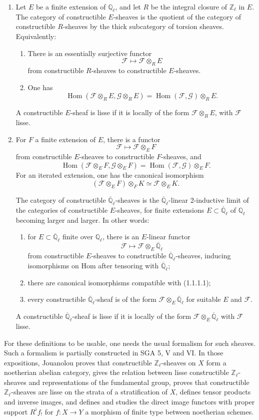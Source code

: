 \documentclass[11pt]{article}
\theoremstyle{remark}
\newcommand{\Ql}{\mathbb{Q}_\ell}
\newcommand{\Qlb}{\overline{\mathbb{Q}}_\ell}
\newcommand{\Zl}{\mathbb{Z}_\ell}
\newcommand{\Hom}{\operatorname{Hom}}
\begin{document}
\begin{enumerate}[label=\alph*)]
\item Let $E$ be a finite extension of $\Ql$, and let $R$ be the integral closure of $\Zl$ in $E$. The category of constructible $E$-sheaves is the quotient of the category of constructible $R$-sheaves by the thick subcategory of torsion sheaves. Equivalently:
\begin{enumerate}[label=(\roman*)]
\item There is an essentially surjective functor
\[
\mathcal F\longmapsto \mathcal F\otimes_R E
\]
from constructible $R$-sheaves to constructible $E$-sheaves.
\item One has
\[
\Hom(\mathcal F\otimes_R E,\mathcal G\otimes_R E)
   = \Hom(\mathcal F,\mathcal G)\otimes_R E.
\]
\end{enumerate}
A constructible $E$-sheaf is lisse if it is locally of the form $\mathcal F\otimes_R E$, with $\mathcal F$ lisse.

\item For $F$ a finite extension of $E$, there is a functor
\[
\mathcal F\longmapsto \mathcal F\otimes_E F
\]
from constructible $E$-sheaves to constructible $F$-sheaves, and
\[
\Hom(\mathcal F\otimes_E F,\mathcal G\otimes_E F)
  =\Hom(\mathcal F,\mathcal G)\otimes_E F.
\]
For an iterated extension, one has the canonical isomorphism
\[
(\mathcal F\otimes_E F)\otimes_F K\simeq \mathcal F\otimes_E K. \tag{1.1.1.1}
\]

The category of constructible $\Qlb$-sheaves is the $\Qlb$-linear 2-inductive limit of the categories of constructible $E$-sheaves, for finite extensions $E\subset\Qlb$ of $\Ql$ becoming larger and larger. In other words:
\begin{enumerate}[label=(\roman*)]
\item for $E\subset\Qlb$ finite over $\Ql$, there is an $E$-linear functor
\[
\mathcal F\longmapsto \mathcal F\otimes_E \Qlb
\]
from constructible $E$-sheaves to constructible $\Qlb$-sheaves, inducing isomorphisms on Hom after tensoring with $\Qlb$;
\item there are canonical isomorphisms compatible with (1.1.1.1);
\item every constructible $\Qlb$-sheaf is of the form $\mathcal F\otimes_E\Qlb$ for suitable $E$ and $\mathcal F$.
\end{enumerate}
A constructible $\Qlb$-sheaf is lisse if it is locally of the form $\mathcal F\otimes_E\Qlb$ with $\mathcal F$ lisse.
\end{enumerate}

For these definitions to be usable, one needs the usual formalism for such sheaves. Such a formalism is partially constructed in SGA 5, V and VI. In those expositions, Jouanolou proves that constructible $\Zl$-sheaves on $X$ form a noetherian abelian category, gives the relation between lisse constructible $\Zl$-sheaves and representations of the fundamental group, proves that constructible $\Zl$-sheaves are lisse on the strata of a stratification of $X$, defines tensor products and inverse images, and defines and studies the direct image functors with proper support $R^if_!$ for $f:X\to Y$ a morphism of finite type between noetherian schemes.
\end{document}
